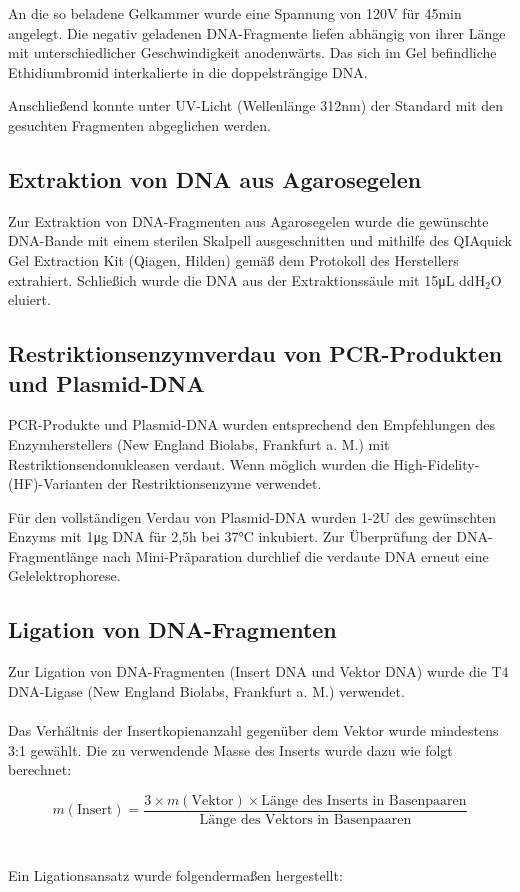 An die so beladene Gelkammer wurde eine Spannung von 120\si{\volt} für 45\si{\minute} angelegt. Die negativ geladenen DNA-Fragmente liefen abhängig von ihrer Länge mit unterschiedlicher Geschwindigkeit anodenwärts. Das sich im Gel befindliche Ethidiumbromid interkalierte in die doppelsträngige DNA.

Anschließend konnte unter UV-Licht (Wellenlänge 312\si{\nano\meter}) der Standard mit den gesuchten Fragmenten abgeglichen werden.

\subsection{Extraktion von DNA aus Agarosegelen}
Zur Extraktion von DNA-Fragmenten aus Agarosegelen wurde die gewünschte DNA-Bande mit einem sterilen Skalpell ausgeschnitten und mithilfe des QIAquick Gel Extraction Kit (Qiagen, Hilden) gemäß dem Protokoll des Herstellers extrahiert. Schließich wurde die DNA aus der Extraktionssäule mit 15\si{\micro\liter} ddH$_2$O eluiert.

\subsection{Restriktionsenzymverdau von PCR-Produkten und Plasmid-DNA}
PCR-Produkte und Plasmid-DNA wurden entsprechend den Empfehlungen des Enzymherstellers (New England Biolabs, Frankfurt a. M.) mit Restriktionsendonukleasen verdaut. Wenn möglich wurden die High-Fidelity-(HF)-Varianten der Restriktionsenzyme verwendet. 

Für den vollständigen Verdau von Plasmid-DNA wurden 1-2\si{U} des gewünschten Enzyms mit 1\si{\micro\gram} DNA für 2,5\si{\hour} bei 37\si{\celsius} inkubiert. Zur Überprüfung der DNA-Fragmentlänge nach Mini-Präparation durchlief die verdaute DNA erneut eine Gelelektrophorese. 

\subsection{Ligation von DNA-Fragmenten}
Zur Ligation von DNA-Fragmenten (Insert DNA und Vektor DNA) wurde die T4 DNA-Ligase (New England Biolabs, Frankfurt a. M.) verwendet. 
\\ \\
Das Verhältnis der Insertkopienanzahl gegenüber dem Vektor wurde mindestens 3:1 gewählt. Die zu verwendende Masse des Inserts wurde dazu wie folgt berechnet:

\begin{equation*}
m(\text{Insert}) = \frac{3 \times m(\text{Vektor}) \times \text{Länge des Inserts in Basenpaaren}}{\text{Länge des Vektors in Basenpaaren}}
\end{equation*}
\\ \\
Ein Ligationsansatz wurde folgendermaßen hergestellt:

